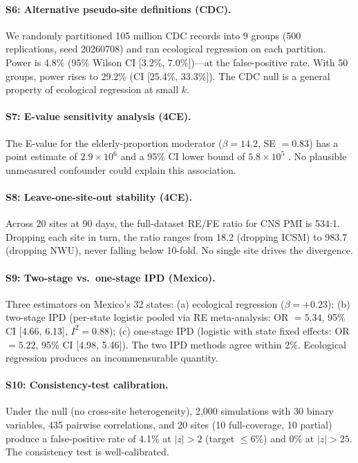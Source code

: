 \documentclass{article}
\begin{document}
\paragraph{S6: Alternative pseudo-site definitions (CDC).}
We randomly partitioned 105 million CDC records into 9 groups
(500 replications, seed 20260708) and ran ecological regression
on each partition.  Power is 4.8\% (95\% Wilson CI [3.2\%, 7.0\%])---at
the false-positive rate.  With 50 groups, power rises to 29.2\%
(CI [25.4\%, 33.3\%]).  The CDC null is a general property of
ecological regression at small $k$.

\paragraph{S7: E-value sensitivity analysis (4CE).}
The E-value for the elderly-proportion moderator ($\beta = 14.2$,
SE $= 0.83$) has a point estimate of $2.9 \times 10^{6}$ and a
95\% CI lower bound of $5.8 \times 10^{5}$
\cite{vanderweele2017}.  No plausible unmeasured confounder could
explain this association.

\paragraph{S8: Leave-one-site-out stability (4CE).}
Across 20 sites at 90 days, the full-dataset RE/FE ratio for CNS PMI
is 534:1.  Dropping each site in turn, the ratio ranges from 18.2
(dropping ICSM) to 983.7 (dropping NWU), never falling below 10-fold.
No single site drives the divergence.

\paragraph{S9: Two-stage vs.\ one-stage IPD (Mexico).}
Three estimators on Mexico's 32 states: (a) ecological regression
($\beta = +0.23$); (b) two-stage IPD (per-state logistic pooled
via RE meta-analysis: OR $= 5.34$, 95\% CI [4.66, 6.13],
$I^2 = 0.88$); (c) one-stage IPD (logistic with state fixed effects:
OR $= 5.22$, 95\% CI [4.98, 5.46]).  The two IPD methods agree
within 2\%.  Ecological regression produces an incommensurable quantity.

\paragraph{S10: Consistency-test calibration.}
Under the null (no cross-site heterogeneity), 2{,}000 simulations
with 30 binary variables, 435 pairwise correlations, and 20 sites
(10 full-coverage, 10 partial) produce a false-positive rate of
4.1\% at $|z| > 2$ (target $\leq 6\%$) and 0\% at $|z| > 25$.
The consistency test is well-calibrated.




\end{document}
